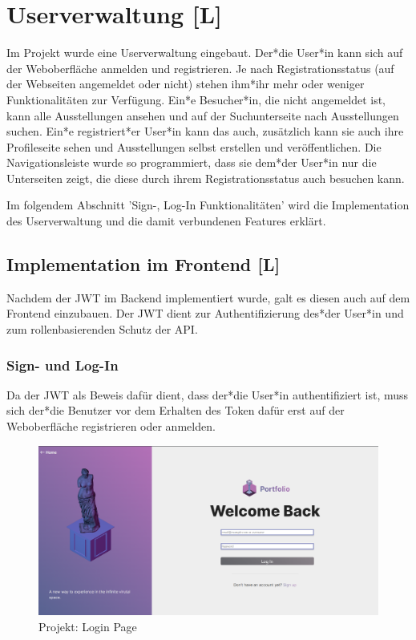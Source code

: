 \section{Userverwaltung [L]}
Im Projekt wurde eine Userverwaltung eingebaut. Der*die User*in kann sich auf der Weboberfläche anmelden und registrieren. Je nach Registrationsstatus (auf der Webseiten angemeldet oder nicht) stehen ihm*ihr mehr oder weniger Funktionalitäten zur Verfügung. Ein*e Besucher*in, die nicht angemeldet ist, kann alle Ausstellungen ansehen und auf der Suchunterseite nach Ausstellungen suchen. Ein*e registriert*er User*in kann das auch, zusätzlich kann sie auch ihre Profileseite sehen und Ausstellungen selbst erstellen und veröffentlichen. Die Navigationsleiste wurde so programmiert, dass sie dem*der User*in nur die Unterseiten zeigt, die diese durch ihrem Registrationsstatus auch besuchen kann. 

Im folgendem Abschnitt 'Sign-, Log-In Funktionalitäten' wird die Implementation des Userverwaltung und die damit verbundenen Features erklärt. 

\subsection{Implementation im Frontend [L]}
Nachdem der JWT im Backend implementiert wurde, galt es diesen auch auf dem Frontend einzubauen. Der JWT dient zur Authentifizierung des*der User*in und zum rollenbasierenden Schutz der API. 

\subsubsection{Sign- und Log-In}
Da der JWT als Beweis dafür dient, dass der*die User*in authentifiziert ist, muss sich der*die Benutzer vor dem Erhalten des Token dafür erst auf der Weboberfläche registrieren oder anmelden. 

\begin{figure}
    \centering
    \includegraphics[scale=0.25]{pics/GalleryLogIn.png}
    \caption{Projekt: Login Page}
    \label{fig:impl:login}
\end{figure}

